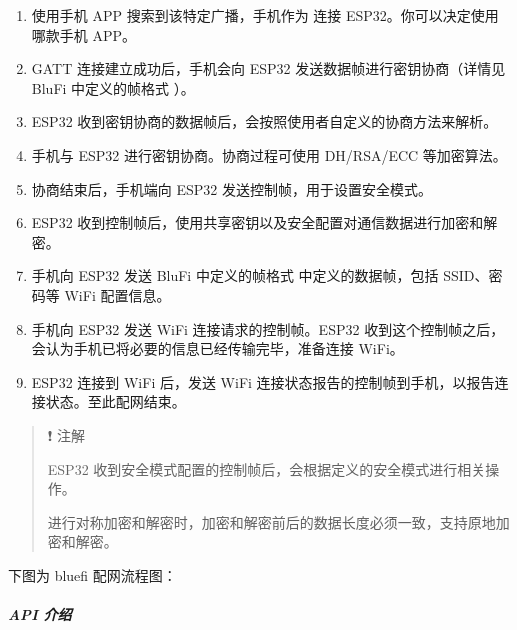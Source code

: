 \documentclass[a4paper,12pt,english]{sphinxmanual}
\begin{document}
{{\begin{enumerate}
\item {} 
\sphinxAtStartPar
使用手机 APP 搜索到该特定广播，手机作为  连接 ESP32。你可以决定使用哪款手机 APP。

\item {} 
\sphinxAtStartPar
GATT 连接建立成功后，手机会向 ESP32 发送数据帧进行密钥协商（详情见 BluFi 中定义的帧格式 ）。

\item {} 
\sphinxAtStartPar
ESP32 收到密钥协商的数据帧后，会按照使用者自定义的协商方法来解析。

\item {} 
\sphinxAtStartPar
手机与 ESP32 进行密钥协商。协商过程可使用 DH/RSA/ECC 等加密算法。

\item {} 
\sphinxAtStartPar
协商结束后，手机端向 ESP32 发送控制帧，用于设置安全模式。

\item {} 
\sphinxAtStartPar
ESP32 收到控制帧后，使用共享密钥以及安全配置对通信数据进行加密和解密。

\item {} 
\sphinxAtStartPar
手机向 ESP32 发送 BluFi 中定义的帧格式 中定义的数据帧，包括 SSID、密码等 Wi\sphinxhyphen{}Fi 配置信息。

\item {} 
\sphinxAtStartPar
手机向 ESP32 发送 Wi\sphinxhyphen{}Fi 连接请求的控制帧。ESP32 收到这个控制帧之后，会认为手机已将必要的信息已经传输完毕，准备连接 Wi\sphinxhyphen{}Fi。

\item {} 
\sphinxAtStartPar
ESP32 连接到 Wi\sphinxhyphen{}Fi 后，发送 Wi\sphinxhyphen{}Fi 连接状态报告的控制帧到手机，以报告连接状态。至此配网结束。

\end{enumerate}
\begin{quote}

\sphinxAtStartPar
❗ 注解

\sphinxAtStartPar
ESP32 收到安全模式配置的控制帧后，会根据定义的安全模式进行相关操作。

\sphinxAtStartPar
进行对称加密和解密时，加密和解密前后的数据长度必须一致，支持原地加密和解密。
\end{quote}

\sphinxAtStartPar
下图为 bluefi 配网流程图：

\sphinxAtStartPar
{}


\subparagraph{API 介绍}
\label{\detokenize{exp-esp32/bluetooth/blufi:api}}
\begin{sphinxVerbatim}[commandchars=\\\{\}]
\end{sphinxVerbatim}

}}
\end{document}
